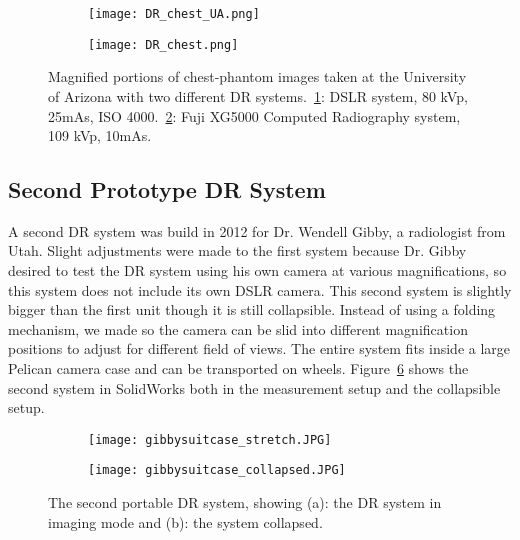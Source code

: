 \begin{figure}[h]
\centering
	\begin{subfigure}[b]{0.45\linewidth}
	\centering
	\texttt{[image: DR\_chest\_UA.png]}
	\caption{}
	\label{fig:DR_chest_film}
	\end{subfigure}
	\hspace{1 cm}
	\begin{subfigure}[b]{0.45\linewidth}
	\texttt{[image: DR\_chest.png]}
	\caption{}
	\label{fig:DR_chest}
	\end{subfigure}
\caption{Magnified portions of chest-phantom images taken at the University of Arizona with two different DR systems.~\ref{fig:DR_chest_film}: DSLR system, 80 kVp, 25mAs, ISO 4000.~\ref{fig:DR_chest}: Fuji XG5000 Computed Radiography system, 109 kVp, 10mAs.}
\label{fig:DR_chest_both}
\end{figure}

\subsection{Second Prototype DR System}
A second DR system was build in 2012 for Dr. Wendell Gibby, a radiologist from Utah.  Slight adjustments were made to the first system because Dr. Gibby desired to test the DR system using his own camera at various magnifications, so this system does not include its own DSLR camera.  This second system is slightly bigger than the first unit though it is still collapsible.  Instead of using a folding mechanism, we made so the camera can be slid into different magnification positions to adjust for different field of views.  The entire system fits inside a large Pelican camera case and can be transported on wheels.  Figure~\ref{fig:DR2} shows the second system in SolidWorks both in the measurement setup and the collapsible setup.

\begin{figure}[h]
	\begin{subfigure}[b]{0.45\linewidth}
	\centering
	\texttt{[image: gibbysuitcase\_stretch.JPG]}
	\caption{}
	\label{DR2stretched}
	\end{subfigure}
\hspace{0.2cm}
	\begin{subfigure}[b]{0.45\linewidth}
	\centering
	\texttt{[image: gibbysuitcase\_collapsed.JPG]}
	\caption{}
	\label{fig:DR2collapsed}
	\end{subfigure}
\caption{The second portable DR system, showing (a): the DR system in imaging mode and (b): the system collapsed.}
\label{fig:DR2}	
\end{figure}

